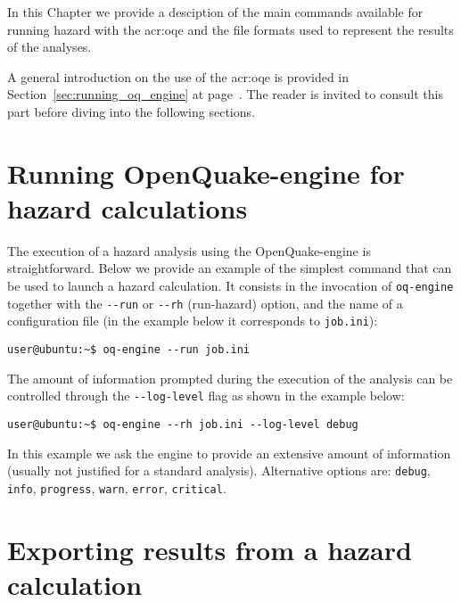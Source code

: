 In this Chapter we provide a desciption of the main commands available for
running hazard with the \gls{acr:oqe} and the file formats used to represent
the results of the analyses.

A general introduction on the use of the \glsdesc{acr:oqe} is provided in
Section~\ref{sec:running_oq_engine} at page~\pageref{sec:running_oq_engine}. The
reader is invited to consult this part before diving into the following
sections.


\section{Running OpenQuake-engine for hazard calculations}
\label{sec:running_hazard_calculations}

The execution of a hazard analysis using the OpenQuake-engine is
straightforward. Below we provide an example of the simplest command that can be
used to launch a hazard calculation. It consists in the invocation of \texttt
{oq-engine} together with the \texttt{-{}-run} or \texttt{-{}-rh} (run-hazard) option, and the name of a configuration file (in the example below it
corresponds to \texttt{job.ini}):

\begin{Verbatim}[frame=single, commandchars=\\\{\}, fontsize=\small]
user@ubuntu:~$ oq-engine --run job.ini
\end{Verbatim}

The amount of information prompted during the execution of the analysis can be
controlled through the \texttt{-{}-log-level} flag as shown in the example below:

\begin{Verbatim}[frame=single, commandchars=\\\{\}, fontsize=\small]
user@ubuntu:~$ oq-engine --rh job.ini --log-level debug
\end{Verbatim}

In this example we ask the engine to provide an extensive amount of information
(usually not justified for a standard analysis). Alternative options are:
\texttt{debug}, \texttt{info}, \texttt{progress}, \texttt{warn}, \texttt{error},
\texttt{critical}.


\section{Exporting results from a hazard calculation}
\label{sec:exporting_hazard_results}

